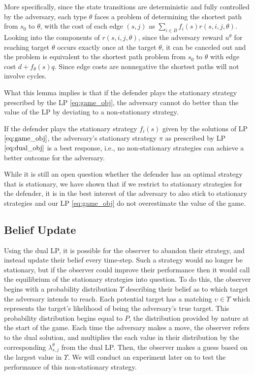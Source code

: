 More specifically,
since the state transitions are deterministic and fully controlled by the adversary,
each type $\theta$ faces a problem of determining the shortest path from $s_0$ to $\theta$, 
with the cost of each edge $(s,j)$ as
$\sum_{i\in B}f_i(s) r(s,i,j,\theta)$.
Looking into the components of $r(s,i,j,\theta)$, since the adversary reward $u^\theta$ for reaching target $\theta$ occurs exactly once at the target $\theta$,
it can be canceled out and the problem is equivalent to the shortest path problem from $s_0$ to $\theta$ with
edge cost $d+f_\theta(s) q$. Since edge costs are nonnegative the shortest paths will not involve cycles.

What this lemma implies is that if the defender plays the stationary strategy prescribed by the LP \eqref{eq:game_obj}, the adversary cannot 
do better than the value of the LP by deviating to a non-stationary strategy.
\begin{corollary}
If the defender plays the stationary strategy $f_i(s)$
given by the solutions of LP $\eqref{eq:game_obj}$,
the adversary's stationary strategy $\pi$ as prescribed by
LP $\eqref{eq:dual_obj}$ is a best response, i.e., no
non-stationary strategies can achieve a better outcome for the adversary.
\end{corollary}

While it is still an open question whether the defender has an optimal strategy that is stationary,
we have shown that if we restrict to  stationary strategies for the defender, it is in the best interest of the adversary to also stick to stationary strategies and our LP \eqref{eq:game_obj} do not overestimate the value of the game. 

\subsection{Belief Update}
Using the dual LP, it is possible for the observer to abandon their strategy, and instead update their belief every time-step. Such a strategy would no longer be stationary, but if the observer could improve their performance then it would call the equilibrium of the stationary strategies into question. To do this, the observer begins with a probability distribution $\Upsilon$ describing their belief as to which target the adversary intends to reach. Each potential target has a matching $\upsilon \in \Upsilon$ which represents the target's likelihood of being the adversary's true target. This probability distribution begins equal to $P$, the distribution provided by nature at the start of the game. Each time the adversary makes a move, the observer refers to the dual solution, and multiplies the each value in their distribution by the corresponding $\lambda^\theta_{s,j}$ from the dual LP. Then, the observer makes a guess based on the largest value in $\Upsilon$. We will conduct an experiment later on to test the performance of this non-stationary strategy.

